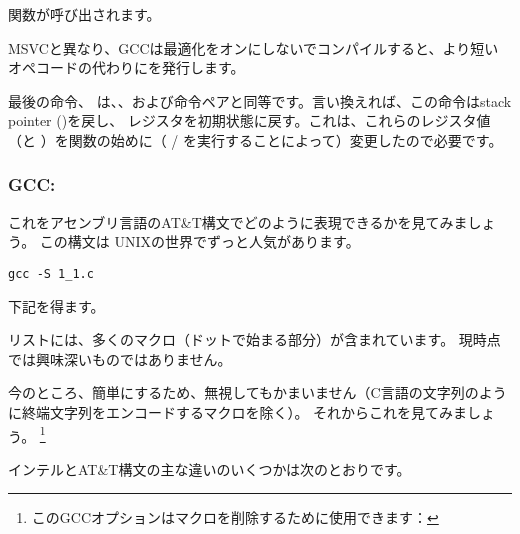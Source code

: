 \printf 関数が呼び出されます。

MSVCと異なり、GCCは最適化をオンにしないでコンパイルすると、より短いオペコードの代わりにを発行します。

最後の命令、 \LEAVE は、、および命令ペアと同等です。言い換えれば、この命令は\gls{stack pointer} (\ESP)を戻し、 \EBP レジスタを初期状態に戻す。これは、これらのレジスタ値（\ESP と \EBP ）を関数の始めに（ / を実行することによって）変更したので必要です。

\subsubsection{GCC: \ATTSyntax}
\label{ATT_syntax}

これをアセンブリ言語のAT\&T構文でどのように表現できるかを見てみましょう。 この構文は
UNIXの世界でずっと人気があります。

\begin{lstlisting}[caption=let's compile in GCC 4.7.3]
gcc -S 1_1.c
\end{lstlisting}

下記を得ます。



リストには、多くのマクロ（ドットで始まる部分）が含まれています。 現時点では興味深いものではありません。

今のところ、簡単にするため、無視してもかまいません（C言語の文字列のように終端文字列をエンコードするマクロを除く）。 
それからこれを見てみましょう。
\footnote{このGCCオプションはマクロを削除するために使用できます：}



\myindex{\ATTSyntax}
\myindex{\IntelSyntax}
インテルとAT\&T構文の主な違いのいくつかは次のとおりです。

